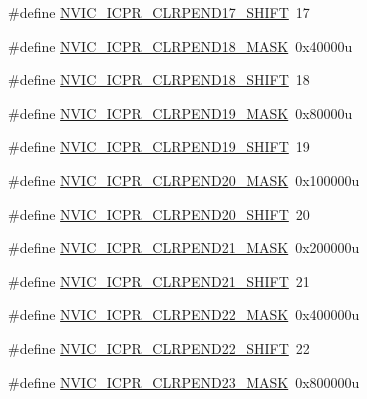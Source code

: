 \begin{DoxyCompactItemize}
\item 
\#define \hyperlink{group___n_v_i_c___register___masks_gaf7b119c8507f2c68099f82a21191ec8f}{N\+V\+I\+C\+\_\+\+I\+C\+P\+R\+\_\+\+C\+L\+R\+P\+E\+N\+D17\+\_\+\+S\+H\+I\+FT}~17
\item 
\#define \hyperlink{group___n_v_i_c___register___masks_gaeb056b06ea673a36c0668609aa2b5429}{N\+V\+I\+C\+\_\+\+I\+C\+P\+R\+\_\+\+C\+L\+R\+P\+E\+N\+D18\+\_\+\+M\+A\+SK}~0x40000u
\item 
\#define \hyperlink{group___n_v_i_c___register___masks_ga0d69ef0706d76fcda2c723255060c413}{N\+V\+I\+C\+\_\+\+I\+C\+P\+R\+\_\+\+C\+L\+R\+P\+E\+N\+D18\+\_\+\+S\+H\+I\+FT}~18
\item 
\#define \hyperlink{group___n_v_i_c___register___masks_gada49f8082e4c597bab2cd511e37be5a3}{N\+V\+I\+C\+\_\+\+I\+C\+P\+R\+\_\+\+C\+L\+R\+P\+E\+N\+D19\+\_\+\+M\+A\+SK}~0x80000u
\item 
\#define \hyperlink{group___n_v_i_c___register___masks_gaa0e63343e2eff0c67356fce25bfbffcd}{N\+V\+I\+C\+\_\+\+I\+C\+P\+R\+\_\+\+C\+L\+R\+P\+E\+N\+D19\+\_\+\+S\+H\+I\+FT}~19
\item 
\#define \hyperlink{group___n_v_i_c___register___masks_ga3134a3b048a677d2bae8a617d29f1d4c}{N\+V\+I\+C\+\_\+\+I\+C\+P\+R\+\_\+\+C\+L\+R\+P\+E\+N\+D20\+\_\+\+M\+A\+SK}~0x100000u
\item 
\#define \hyperlink{group___n_v_i_c___register___masks_gacdaa2cee9af15389bce4b98f565ecff9}{N\+V\+I\+C\+\_\+\+I\+C\+P\+R\+\_\+\+C\+L\+R\+P\+E\+N\+D20\+\_\+\+S\+H\+I\+FT}~20
\item 
\#define \hyperlink{group___n_v_i_c___register___masks_ga139c52aed9f13266dcbcd4a35062ad9d}{N\+V\+I\+C\+\_\+\+I\+C\+P\+R\+\_\+\+C\+L\+R\+P\+E\+N\+D21\+\_\+\+M\+A\+SK}~0x200000u
\item 
\#define \hyperlink{group___n_v_i_c___register___masks_ga197f79ac8c0c2d547290f6ea241935ce}{N\+V\+I\+C\+\_\+\+I\+C\+P\+R\+\_\+\+C\+L\+R\+P\+E\+N\+D21\+\_\+\+S\+H\+I\+FT}~21
\item 
\#define \hyperlink{group___n_v_i_c___register___masks_gaec1907fa7093046e45963c4df83bb654}{N\+V\+I\+C\+\_\+\+I\+C\+P\+R\+\_\+\+C\+L\+R\+P\+E\+N\+D22\+\_\+\+M\+A\+SK}~0x400000u
\item 
\#define \hyperlink{group___n_v_i_c___register___masks_ga0467f3dda1ea857f515adcb12229f645}{N\+V\+I\+C\+\_\+\+I\+C\+P\+R\+\_\+\+C\+L\+R\+P\+E\+N\+D22\+\_\+\+S\+H\+I\+FT}~22
\item 
\#define \hyperlink{group___n_v_i_c___register___masks_ga0792ed0c9fa0fe4f66d3788dae1ff0a7}{N\+V\+I\+C\+\_\+\+I\+C\+P\+R\+\_\+\+C\+L\+R\+P\+E\+N\+D23\+\_\+\+M\+A\+SK}~0x800000u

\end{DoxyCompactItemize}

